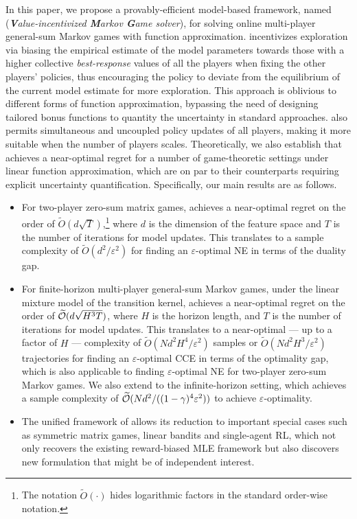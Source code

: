 In this paper, we propose a provably-efficient model-based framework, named \name (\emph{\textbf{V}alue-incentivized \textbf{M}arkov \textbf{G}ame solver}), for solving online multi-player general-sum Markov games with function approximation. 
\name  
incentivizes exploration via biasing the empirical estimate of the model parameters towards those with a higher collective {\em best-response} values of all the players when fixing the other players' policies, thus encouraging the policy to deviate from the equilibrium of the current model estimate for more exploration. This approach is oblivious to different forms of function approximation, bypassing the need of designing tailored bonus functions to quantity the uncertainty in standard approaches. \name also permits simultaneous and uncoupled policy updates of all players, making it more suitable when the number of players scales. Theoretically, we also establish that \name achieves a near-optimal regret for a number of game-theoretic settings under linear function approximation, which are on par to their counterparts requiring explicit uncertainty quantification. Specifically, our main results are as follows.
\begin{itemize} 
    \item For two-player zero-sum matrix games, \name  achieves a near-optimal regret on the order of $\widetilde{O}(d\sqrt{T})$,\footnote{The notation $\widetilde{O}(\cdot)$ hides logarithmic factors in the standard order-wise notation.} where $d$ is the dimension of the feature space and $T$ is the number of iterations for model updates.  This translates to a sample complexity of $\widetilde{O}(d^2/\varepsilon^2)$ for finding an $\varepsilon$-optimal NE in terms of the duality gap.
    \item For finite-horizon multi-player general-sum Markov games, under the linear mixture model of the transition kernel, \name achieves a near-optimal regret on the order of $\widetilde{{\mathcal{O}}}(d\sqrt{H^3T})$, where $H$ is the horizon length, and $T$ is the number of iterations for model updates. This translates to a near-optimal  --- up to a factor of $H$ ---  complexity of $\widetilde{O}(Nd^2H^4/\varepsilon^2)$ samples or $\widetilde{O}(Nd^2H^3/\varepsilon^2)$ trajectories for finding an $\varepsilon$-optimal CCE in terms of the optimality gap, which is also applicable to  finding $\varepsilon$-optimal NE for two-player zero-sum Markov games. We also extend \name to the infinite-horizon setting, which achieves a sample complexity of $\widetilde{{\mathcal{O}}}(Nd^2/ ((1-\gamma)^4\varepsilon^2 ))$ to achieve $\varepsilon$-optimality.
      
     
     \item The unified framework of \name allows its reduction to important special cases such as symmetric matrix games, linear bandits and single-agent RL, which not only recovers the existing reward-biased MLE framework  but also discovers new formulation that might be of independent interest. 

\end{itemize}

